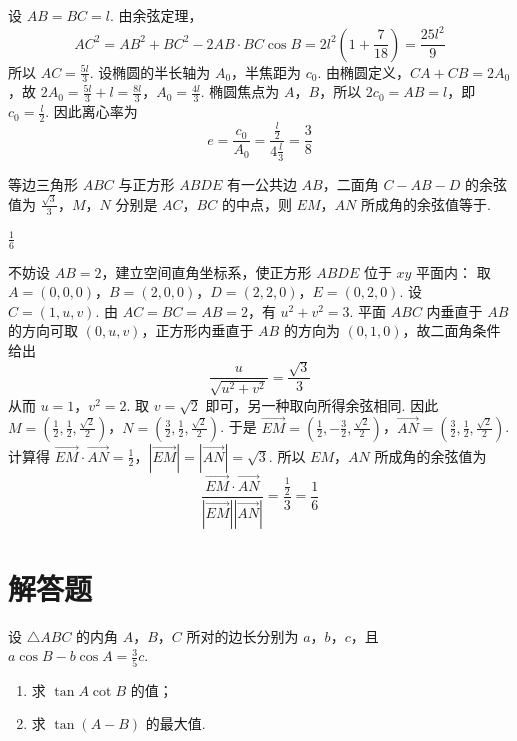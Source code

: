 \begin{solution}
设 \(AB=BC=l\). 由余弦定理，
\[
AC^2=AB^2+BC^2-2AB\cdot BC\cos B
=2l^2\left(1+\frac{7}{18}\right)=\frac{25l^2}{9}
\]
所以 \(AC=\frac{5l}{3}\). 设椭圆的半长轴为 \(A_0\)，半焦距为 \(c_0\). 由椭圆定义，\(CA+CB=2A_0\)，故
\(2A_0=\frac{5l}{3}+l=\frac{8l}{3}\)，\(A_0=\frac{4l}{3}\).
椭圆焦点为 \(A\)，\(B\)，所以 \(2c_0=AB=l\)，即 \(c_0=\frac{l}{2}\). 因此离心率为
\[
e=\frac{c_0}{A_0}=\frac{\frac{l}{2}}{4\frac{l}{3}}=\frac{3}{8}
\]
\end{solution}

\begin{problem}
等边三角形 \(ABC\) 与正方形 \(ABDE\) 有一公共边 \(AB\)，二面角 \(C - AB - D\) 的余弦值为 \(\frac{\sqrt{3}}{3}\)，\(M\)，\(N\) 分别是 \(AC\)，\(BC\) 的中点，则 \(EM\)，\(AN\) 所成角的余弦值等于\fillinblank{}.
\end{problem}

\begin{answer}
\(\frac{1}{6}\)
\end{answer}

\begin{solution}
不妨设 \(AB=2\)，建立空间直角坐标系，使正方形 \(ABDE\) 位于 \(xy\) 平面内：
取 \(A=(0,0,0)\)，\(B=(2,0,0)\)，\(D=(2,2,0)\)，\(E=(0,2,0)\).
设 \(C=(1,u,v)\). 由 \(AC=BC=AB=2\)，有 \(u^2+v^2=3\). 平面 \(ABC\) 内垂直于 \(AB\) 的方向可取 \((0,u,v)\)，正方形内垂直于 \(AB\) 的方向为 \((0,1,0)\)，故二面角条件给出
\[
\frac{u}{\sqrt{u^2+v^2}}=\frac{\sqrt{3}}{3}
\]
从而 \(u=1\)，\(v^2=2\). 取 \(v=\sqrt{2}\) 即可，另一种取向所得余弦相同. 因此
\(M=\left(\frac{1}{2},\frac{1}{2},\frac{\sqrt{2}}{2}\right)\)，\(N=\left(\frac{3}{2},\frac{1}{2},\frac{\sqrt{2}}{2}\right)\).
于是
\(\overrightarrow{EM}=\left(\frac{1}{2},-\frac{3}{2},\frac{\sqrt{2}}{2}\right)\)，\(\overrightarrow{AN}=\left(\frac{3}{2},\frac{1}{2},\frac{\sqrt{2}}{2}\right)\).
计算得
\(\overrightarrow{EM}\cdot\overrightarrow{AN}=\frac{1}{2}\)，\(|\overrightarrow{EM}|=|\overrightarrow{AN}|=\sqrt{3}\).
所以 \(EM\)，\(AN\) 所成角的余弦值为
\[
\frac{\overrightarrow{EM}\cdot\overrightarrow{AN}}{|\overrightarrow{EM}||\overrightarrow{AN}|}=\frac{\frac{1}{2}}{3}=\frac{1}{6}
\]
\end{solution}

\section{解答题}

\begin{problem}
设 \(\triangle ABC\) 的内角 \(A\)，\(B\)，\(C\) 所对的边长分别为 \(a\)，\(b\)，\(c\)，且 \(a \cos B - b \cos A = \frac{3}{5}c\).

\begin{enumerate}
\item 求 \(\tan A \cot B\) 的值；
\item 求 \(\tan (A - B)\) 的最大值.
\end{enumerate}
\end{problem}

